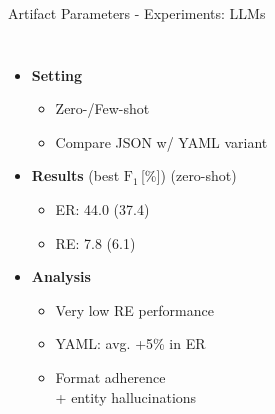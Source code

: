 \documentclass[en,16:9,smallfoot]{sdqbeamer}
\begin{document}
   \begin{frame}{Artifact Parameters - Experiments: LLMs}
   \begin{columns}
           \vspace{-4em}
           \begin{itemize}
               \item \textbf{Setting}
               \begin{itemize}
                   \item Zero-/Few-shot
                   \item Compare JSON w/ YAML variant
               \end{itemize}
               \item \textbf{Results} (best $\text{F}_1$\,[\%]) {\color{contextgrey}(zero-shot)}
               \begin{itemize}
                  \item ER: 44.0 {\color{contextgrey}(37.4)}
                  \item RE: 7.8 {\color{contextgrey}(6.1)}
               \end{itemize}
               \item \textbf{Analysis}
               \begin{itemize}
                  \item Very low RE performance
                  \item YAML: avg. +5\% in ER
                  \item Format adherence\\+ entity hallucinations
               \end{itemize}
           \end{itemize}
        \begin{overlayarea}{\textwidth}{7cm}


\end{overlayarea}
\end{columns}
\end{frame}
\end{document}
